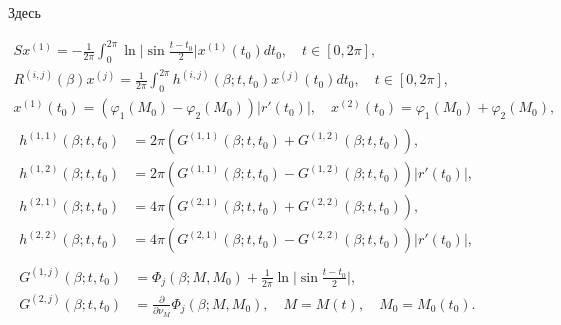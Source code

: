Здесь 


\begin{gather*}


Sx^{(1)}=-\frac{1}{2\pi}\int_0^{2\pi} 


\ln{ \bigg| \sin{\frac{t-t_0}{2}} \bigg|} x^{(1)}(t_0) dt_0 ,


\quad t \in [0,2\pi],\\


%


R^{(i,j)}(\beta)x^{(j)}=\frac{1}{2\pi}


\int_0^{2\pi} h^{(i,j)}(\beta;t,t_0) x^{(j)}(t_0) dt_0,


\quad t \in [0,2\pi],\\


%


x^{(1)}(t_0)=(\varphi_1(M_0)-\varphi_2(M_0)) |r'(t_0)|,\quad


x^{(2)}(t_0)= \varphi_1(M_0)+ \varphi_2(M_0),\\


\begin{align*}


h^{(1,1)}(\beta;t,t_0)&=2\pi


(G^{(1,1)}(\beta;t,t_0) + G^{(1,2)}(\beta;t,t_0)),\\


h^{(1,2)}(\beta;t,t_0)&=2\pi


(G^{(1,1)}(\beta;t,t_0) - G^{(1,2)}(\beta;t,t_0)) |r'(t_0)|,\\


h^{(2,1)}(\beta;t,t_0)&=4\pi


(G^{(2,1)}(\beta;t,t_0) + G^{(2,2)}(\beta;t,t_0)),\\


h^{(2,2)}(\beta;t,t_0)&=4\pi


(G^{(2,1)}(\beta;t,t_0) - G^{(2,2)}(\beta;t,t_0)) 


|r'(t_0)|,


\end{align*}


\\


\begin{align*}


G^{(1,j)}(\beta;t,t_0)&= \Phi_j (\beta;M,M_0)+


\frac{1}{2\pi} \ln{\bigg|\sin{\frac{t-t_0}{2}}\bigg|}, \\


G^{(2,j)}(\beta;t,t_0)&=\frac{\partial}{\partial \nu_M}\Phi_j(\beta;M,M_0), 


\quad M = M(t), \quad M_0 = M_0(t_0).


\end{align*}


\end{gather*}






